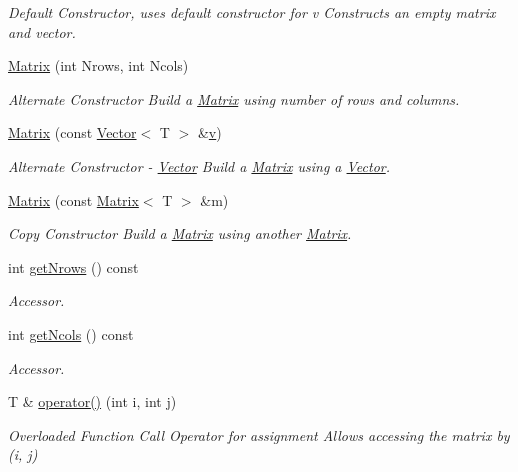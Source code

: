 \begin{DoxyCompactItemize}
\begin{DoxyCompactList}\small\item\em Default Constructor, uses default constructor for v Constructs an empty matrix and vector. \end{DoxyCompactList}\item 
\hyperlink{class_matrix_a59227bad90b3f32e6a73a051301e5348}{Matrix} (int Nrows, int Ncols)
\begin{DoxyCompactList}\small\item\em Alternate Constructor Build a \hyperlink{class_matrix}{Matrix} using number of rows and columns. \end{DoxyCompactList}\item 
\hyperlink{class_matrix_a1cf0d1d0df4b94d462f47d278601242f}{Matrix} (const \hyperlink{class_vector}{Vector}$<$ T $>$ \&\hyperlink{class_matrix_a7b1d6b09f3f6fff47c03f63a51a93cd7}{v})
\begin{DoxyCompactList}\small\item\em Alternate Constructor -\/ \hyperlink{class_vector}{Vector} Build a \hyperlink{class_matrix}{Matrix} using a \hyperlink{class_vector}{Vector}. \end{DoxyCompactList}\item 
\hyperlink{class_matrix_a0bef475d7e55fe78e4d92bda56a31700}{Matrix} (const \hyperlink{class_matrix}{Matrix}$<$ T $>$ \&m)
\begin{DoxyCompactList}\small\item\em Copy Constructor Build a \hyperlink{class_matrix}{Matrix} using another \hyperlink{class_matrix}{Matrix}. \end{DoxyCompactList}\item 
int \hyperlink{class_matrix_a5658122b6be05851795fec8b0b912b98}{get\-Nrows} () const 
\begin{DoxyCompactList}\small\item\em Accessor. \end{DoxyCompactList}\item 
int \hyperlink{class_matrix_a2b9066bc7fd0c3d3ffb7a93fd3e835fe}{get\-Ncols} () const 
\begin{DoxyCompactList}\small\item\em Accessor. \end{DoxyCompactList}\item 
T \& \hyperlink{class_matrix_afba969d5358358fee9170fac1ca5aed8}{operator()} (int i, int j)
\begin{DoxyCompactList}\small\item\em Overloaded Function Call Operator for assignment Allows accessing the matrix by (i, j) \end{DoxyCompactList}\item 

\end{DoxyCompactItemize}
